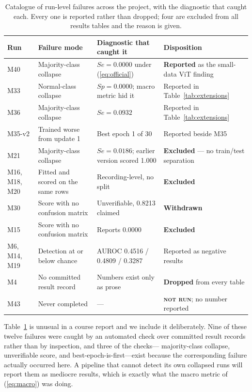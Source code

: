\documentclass[journal,onecolumn]{IEEEtran}
\newcommand{\best}[1]{\textbf{#1}}
\newcommand{\notrun}{\textsc{not run}}
\begin{document}
\begin{table}[!t]
\centering
\caption{Catalogue of run-level failures across the project, with the diagnostic
that caught each. Every one is reported rather than dropped; four are excluded
from all results tables and the reason is given.}
\label{tab:failures}
\small
\begin{tabular}{llll}
\toprule
Run & Failure mode & Diagnostic that caught it & Disposition \\
\midrule
M40 & Majority-class collapse & $Se = 0.0000$ under (\ref{eq:official}) & \best{Reported} as the small-data ViT finding \\
M33 & Normal-class collapse & $Sp = 0.0000$; macro metric hid it & Reported in Table~\ref{tab:extensions} \\
M36 & Majority-class collapse & $Se = 0.0932$ & Reported in Table~\ref{tab:extensions} \\
M35-v2 & Trained worse from update 1 & Best epoch 1 of 30 & Reported beside M35 \\
M21 & Majority-class collapse & $Se = 0.0186$; earlier version scored 1.000 & \best{Excluded} --- no train/test separation \\
M16, M18, M20 & Fitted and scored on the same rows & Recording-level, no split & \best{Excluded} \\
M30 & Score with no confusion matrix & Unverifiable, 0.8213 claimed & \best{Withdrawn} \\
M15 & Score with no confusion matrix & Reports 0.0000 & \best{Excluded} \\
M6, M14, M19 & Detection at or below chance & AUROC 0.4516 / 0.4809 / 0.3287 & Reported as negative results \\
M4 & No committed result record & Numbers exist only as prose & \best{Dropped} from every table \\
M43 & Never completed & --- & \best{\notrun}; no number reported \\
\bottomrule
\end{tabular}
\end{table}

Table~\ref{tab:failures} is unusual in a course report and we include it
deliberately. Nine of these twelve failures were caught by an automated check over
committed result records rather than by inspection, and three of the checks---
majority-class collapse, unverifiable score, and best-epoch-is-first---exist
because the corresponding failure actually occurred here. A pipeline that cannot
detect its own collapsed runs will report them as mediocre results, which is
exactly what the macro metric of (\ref{eq:macro}) was doing.
\end{document}
